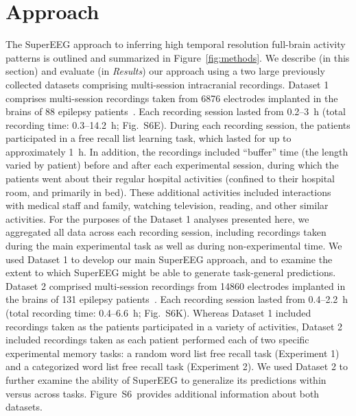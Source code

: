 \documentclass[11pt]{article}
\newcommand{\suppstats}{S6}
\begin{document}
\section*{Approach} The SuperEEG approach to inferring high temporal resolution
full-brain activity patterns is outlined and summarized in
Figure~\ref{fig:methods}. We describe (in this section) and evaluate (in
\textit{Results}) our approach using a two large previously collected datasets
comprising multi-session intracranial recordings. Dataset 1 comprises
multi-session recordings taken from 6876 electrodes implanted in the brains of
88 epilepsy patients~\citep{SedeEtal03, SedeEtal07a, SedeEtal07b, MannEtal11,
MannEtal12}.  Each recording session lasted from 0.2--3~h (total recording time:
0.3--14.2~h; Fig.~\suppstats E).  During each recording session, the patients
participated in a free recall list learning task, which lasted for up to
approximately 1~h.  In addition, the recordings included ``buffer'' time (the
length varied by patient) before and after each experimental session, during
which the patients went about their regular hospital activities (confined to
their hospital room, and primarily in bed).  These additional activities
included interactions with medical staff and family, watching television,
reading, and other similar activities.  For the purposes of the Dataset 1
analyses presented here, we aggregated all data across each recording session,
including recordings taken during the main experimental task as well as during
non-experimental time.  We used Dataset 1 to develop our main SuperEEG approach,
and to examine the extent to which SuperEEG might be able to generate
task-general predictions.  Dataset 2 comprised multi-session recordings from
14860 electrodes implanted in the brains of 131 epilepsy
patients~\citep{EzzyEtal17, HoraEtal17, KragEtal17, KuceEtal17, LinEtal17,
SoloEtal18, WeidEtal18, EzzyEtal18, KuceEtal18}.  Each recording session lasted
from 0.4--2.2~h (total recording time: 0.4--6.6~h; Fig.~\suppstats K).  Whereas
Dataset 1 included recordings taken as the patients participated in a variety of
activities, Dataset 2 included recordings taken as each patient performed each
of two specific experimental memory tasks: a random word list free recall task
(Experiment 1) and a categorized word list free recall task (Experiment 2).  We
used Dataset 2 to further examine the ability of SuperEEG to generalize its
predictions within versus across tasks.  Figure~\suppstats~provides additional
information about both datasets.
\end{document}
